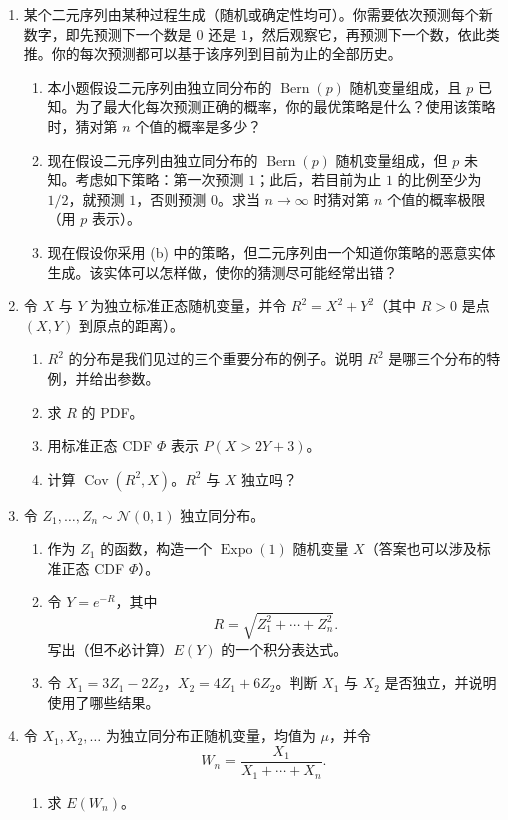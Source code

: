 \documentclass[UTF8,12pt,a4paper,fontset=fandol]{ctexart}
\begin{document}
\begin{enumerate}
  \item 某个二元序列由某种过程生成（随机或确定性均可）。你需要依次预测每个新数字，即先预测下一个数是 $0$ 还是 $1$，然后观察它，再预测下一个数，依此类推。你的每次预测都可以基于该序列到目前为止的全部历史。
  \begin{enumerate}
    \item 本小题假设二元序列由独立同分布的 $\operatorname{Bern}(p)$ 随机变量组成，且 $p$ 已知。为了最大化每次预测正确的概率，你的最优策略是什么？使用该策略时，猜对第 $n$ 个值的概率是多少？
    \item 现在假设二元序列由独立同分布的 $\operatorname{Bern}(p)$ 随机变量组成，但 $p$ 未知。考虑如下策略：第一次预测 $1$；此后，若目前为止 $1$ 的比例至少为 $1/2$，就预测 $1$，否则预测 $0$。求当 $n\to\infty$ 时猜对第 $n$ 个值的概率极限（用 $p$ 表示）。
    \item 现在假设你采用 (b) 中的策略，但二元序列由一个知道你策略的恶意实体生成。该实体可以怎样做，使你的猜测尽可能经常出错？
  \end{enumerate}

  \item 令 $X$ 与 $Y$ 为独立标准正态随机变量，并令 $R^2=X^2+Y^2$（其中 $R>0$ 是点 $(X,Y)$ 到原点的距离）。
  \begin{enumerate}
    \item $R^2$ 的分布是我们见过的三个重要分布的例子。说明 $R^2$ 是哪三个分布的特例，并给出参数。
    \item 求 $R$ 的 PDF。
    \item 用标准正态 CDF $\Phi$ 表示 $P(X>2Y+3)$。
    \item 计算 $\operatorname{Cov}(R^2,X)$。$R^2$ 与 $X$ 独立吗？
  \end{enumerate}

  \item 令 $Z_1,\ldots,Z_n\sim\mathcal N(0,1)$ 独立同分布。
  \begin{enumerate}
    \item 作为 $Z_1$ 的函数，构造一个 $\operatorname{Expo}(1)$ 随机变量 $X$（答案也可以涉及标准正态 CDF $\Phi$）。
    \item 令 $Y=e^{-R}$，其中
    \[
      R=\sqrt{Z_1^2+\cdots+Z_n^2}.
    \]
    写出（但不必计算）$E(Y)$ 的一个积分表达式。
    \item 令 $X_1=3Z_1-2Z_2$，$X_2=4Z_1+6Z_2$。判断 $X_1$ 与 $X_2$ 是否独立，并说明使用了哪些结果。
  \end{enumerate}

  \item 令 $X_1,X_2,\ldots$ 为独立同分布正随机变量，均值为 $\mu$，并令
  \[
    W_n=\frac{X_1}{X_1+\cdots+X_n}.
  \]
  \begin{enumerate}
    \item 求 $E(W_n)$。


\end{enumerate}
\end{enumerate}
\end{document}
